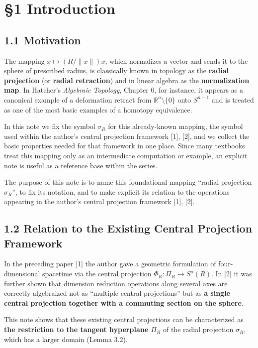 \documentclass[
]{ltjsarticle}
\begin{document}
\section{§1 Introduction}\label{introduction}

\subsection{1.1 Motivation}\label{motivation}

The mapping \(x \mapsto (R/\|x\|) x\), which normalizes a vector and
sends it to the sphere of prescribed radius, is classically known in
topology as the \textbf{radial projection} (or \textbf{radial
retraction}) and in linear algebra as the \textbf{normalization map}. In
Hatcher's \emph{Algebraic Topology}, Chapter 0, for instance, it appears
as a canonical example of a deformation retract from
\(\mathbb{R}^n \setminus \{0\}\) onto \(S^{n-1}\) and is treated as one
of the most basic examples of a homotopy equivalence.

In this note we fix the symbol \(\sigma_R\) for this already-known
mapping, the symbol used within the author's central projection
framework {[}1{]}, {[}2{]}, and we collect the basic properties needed
for that framework in one place. Since many textbooks treat this mapping
only as an intermediate computation or example, an explicit note is
useful as a reference base within the series.

The purpose of this note is to name this foundational mapping ``radial
projection \(\sigma_R\)'', to fix its notation, and to make explicit its
relation to the operations appearing in the author's central projection
framework {[}1{]}, {[}2{]}.

\subsection{1.2 Relation to the Existing Central Projection
Framework}\label{relation-to-the-existing-central-projection-framework}

In the preceding paper {[}1{]} the author gave a geometric formulation
of four-dimensional spacetime via the central projection
\(\Phi_R: \Pi_R \to S^n(R)\). In {[}2{]} it was further shown that
dimension reduction operations along several axes are correctly
algebraized not as ``multiple central projections'' but as \textbf{a
single central projection together with a commuting section on the
sphere}.

This note shows that these existing central projections can be
characterized as \textbf{the restriction to the tangent hyperplane
\(\Pi_R\)} of the radial projection \(\sigma_R\), which has a larger
domain (Lemma 3.2).
\end{document}
